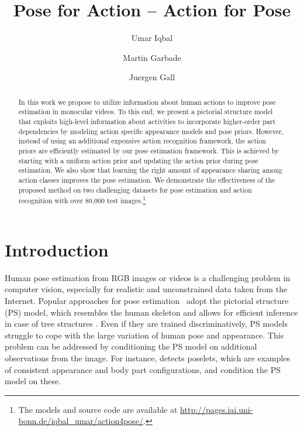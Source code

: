 \documentclass[a4paper, 10pt, conference]{ieeeconf}      \usepackage{FG2017}
\title{\LARGE \bf Pose for Action -- Action for Pose}
\author{\vspace{-1mm}Umar Iqbal}
\author{\vspace{-1mm}Martin Garbade}
\author{\vspace{-1mm}Juergen Gall}
\affil{Computer Vision Group, University of Bonn, Germany \\ \texttt{\footnotesize\{uiqbal, garbade, gall\}@iai.uni-bonn.de}\vspace{-3mm}}
\begin{document}
\maketitle



\begin{abstract}

In this work we propose to utilize information about human actions to improve pose estimation in monocular videos. To this end, we present a  pictorial structure model that exploits high-level information about activities to incorporate higher-order part dependencies by modeling action specific appearance models and pose priors. However, instead of using an additional expensive action recognition framework, the action priors are efficiently estimated by our pose estimation framework. This is achieved by starting with a uniform action prior and updating the action prior during pose estimation. We also show that learning the right amount of appearance sharing among action classes improves the pose estimation. We demonstrate the effectiveness of the proposed method on two challenging datasets for pose estimation and action recognition with over 80,000 test images.\footnote{The models and source code are available at \url{http://pages.iai.uni-bonn.de/iqbal_umar/action4pose/}.}

\end{abstract}

\section{Introduction}

Human pose estimation from RGB images or videos is a challenging problem in computer vision, especially for realistic and unconstrained data taken from the Internet. Popular approaches for pose estimation~\cite{desai_eccv2012,pishchulin_cvpr2013, yang_tpami2014,dantone_tpami2014,cherian_cvpr2014,tompson2014joint} adopt the pictorial structure (PS) model, which resembles the human skeleton and allows for efficient inference in case of tree structures \cite{Felzenszwalb_ijcv2005,felzenszwalb_tpami2010}. Even if they are trained discriminatively, PS models struggle to cope with the large variation of human pose and appearance. 
This problem can be addressed by conditioning the PS model on additional observations from the image. 
For instance, \cite{pishchulin_cvpr2013} detects poselets, which are examples of consistent appearance and body part configurations, and condition the PS model on these. 
\end{document}
